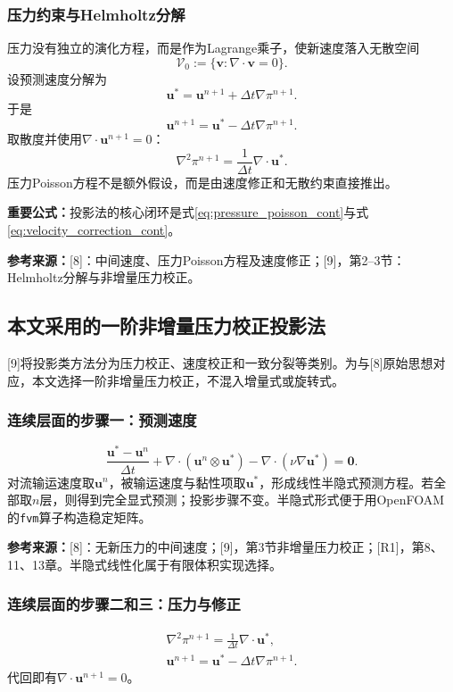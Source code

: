 \documentclass[UTF8,12pt,a4paper]{ctexart}
\numberwithin{equation}{section}
\newcommand{\dt}{\Delta t}
\newcommand{\Chorin}{\textnormal{[8]}}
\newcommand{\Guermond}{\textnormal{[9]}}
\newcommand{\Rone}{\textnormal{[R1]}}
\newcommand{\source}[1]{\par\smallskip\noindent\colorbox{sourcebg}{%
  \parbox{0.955\linewidth}{\footnotesize\color{sourcegray}\textbf{参考来源：}#1}}\par\smallskip}
\newcommand{\keytitle}[1]{\par\smallskip\noindent\colorbox{keybg}{%
  \parbox{0.965\linewidth}{\color{keyblue}\textbf{重要公式：}#1}}\par\smallskip}
\begin{document}
\subsubsection*{压力约束与Helmholtz分解}
压力没有独立的演化方程，而是作为Lagrange乘子，使新速度落入无散空间
\[
  \mathcal V_0:=\{\bm v:\nabla\cdot\bm v=0\}.
\]
设预测速度分解为
\begin{equation}
  \bm u^*=\bm u^{n+1}+\dt\nabla\pi^{n+1}.
  \label{eq:helmholtz_scaled}
\end{equation}
于是
\begin{equation}
  \boxed{\bm u^{n+1}=\bm u^*-\dt\nabla\pi^{n+1}.}
  \label{eq:velocity_correction_cont}
\end{equation}
取散度并使用$\nabla\cdot\bm u^{n+1}=0$：
\begin{equation}
  \boxed{\nabla^2\pi^{n+1}=\frac{1}{\dt}\nabla\cdot\bm u^*.}
  \label{eq:pressure_poisson_cont}
\end{equation}
压力Poisson方程不是额外假设，而是由速度修正和无散约束直接推出。
\keytitle{投影法的核心闭环是式\eqref{eq:pressure_poisson_cont}与式\eqref{eq:velocity_correction_cont}。}
\source{\Chorin：中间速度、压力Poisson方程及速度修正；\Guermond，第2--3节：Helmholtz分解与非增量压力校正。}

\subsection*{本文采用的一阶非增量压力校正投影法}
\Guermond 将投影类方法分为压力校正、速度校正和一致分裂等类别。为与\Chorin 原始思想对应，本文选择一阶非增量压力校正，不混入增量式或旋转式。

\subsubsection*{连续层面的步骤一：预测速度}
\begin{equation}
  \boxed{\frac{\bm u^*-\bm u^n}{\dt}
  +\nabla\cdot(\bm u^n\otimes\bm u^*)
  -\nabla\cdot(\nu\nabla\bm u^*)=\bm0.}
  \label{eq:predictor_semiimplicit}
\end{equation}
对流输运速度取$\bm u^n$，被输运速度与黏性项取$\bm u^*$，形成线性半隐式预测方程。若全部取$n$层，则得到完全显式预测；投影步骤不变。半隐式形式便于用OpenFOAM的\texttt{fvm}算子构造稳定矩阵。
\source{\Chorin：无新压力的中间速度；\Guermond，第3节非增量压力校正；\Rone，第8、11、13章。半隐式线性化属于有限体积实现选择。}

\subsubsection*{连续层面的步骤二和三：压力与修正}
\begin{align}
  \boxed{\nabla^2\pi^{n+1}
  =\frac{1}{\dt}\nabla\cdot\bm u^*,}
  \label{eq:projection_poisson}\\
  \boxed{\bm u^{n+1}=\bm u^*-\dt\nabla\pi^{n+1}.}
  \label{eq:projection_corrector}
\end{align}
代回即有$\nabla\cdot\bm u^{n+1}=0$。
\end{document}
